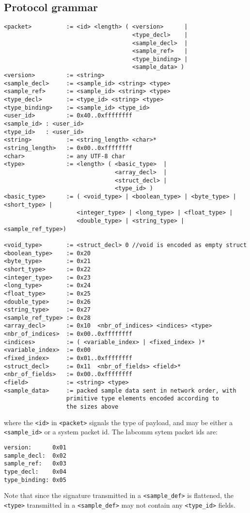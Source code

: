 \documentclass[a4paper]{article}
\begin{document}
\subsection{Protocol grammar}
\label{sec:ConcreteGrammar}
\begin{lstlisting}[basicstyle=\footnotesize\ttfamily]
<packet>          := <id> <length> ( <version>      | 
                                     <type_decl>    | 
                                     <sample_decl>  |
                                     <sample_ref>   |
                                     <type_binding> |
                                     <sample_data> )
<version>         := <string>
<sample_decl>     := <sample_id> <string> <type>
<sample_ref>      := <sample_id> <string> <type>
<type_decl>       := <type_id> <string> <type>
<type_binding>    := <sample_id> <type_id>
<user_id>         := 0x40..0xffffffff  
<sample_id> : <user_id>
<type_id>   : <user_id>
<string>          := <string_length> <char>*
<string_length>   := 0x00..0xffffffff  
<char>            := any UTF-8 char
<type>            := <length> ( <basic_type>  | 
                                <array_decl>  | 
                                <struct_decl> | 
                                <type_id> )
<basic_type>      := ( <void_type> | <boolean_type> | <byte_type> | <short_type> |
                     <integer_type> | <long_type> | <float_type> |
                     <double_type> | <string_type> | <sample_ref_type>)

<void_type>       := <struct_decl> 0 //void is encoded as empty struct
<boolean_type>    := 0x20 
<byte_type>       := 0x21 
<short_type>      := 0x22 
<integer_type>    := 0x23 
<long_type>       := 0x24 
<float_type>      := 0x25 
<double_type>     := 0x26 
<string_type>     := 0x27 
<sample_ref_type> := 0x28 
<array_decl>      := 0x10  <nbr_of_indices> <indices> <type>
<nbr_of_indices>  := 0x00..0xffffffff  
<indices>         := ( <variable_index> | <fixed_index> )*
<variable_index>  := 0x00  
<fixed_index>     := 0x01..0xffffffff  
<struct_decl>     := 0x11  <nbr_of_fields> <field>*
<nbr_of_fields>   := 0x00..0xffffffff  
<field>           := <string> <type>
<sample_data>     := packed sample data sent in network order, with
                  primitive type elements encoded according to
                  the sizes above
\end{lstlisting}
where the \verb+<id>+ in \verb+<packet>+ signals the type of payload,
and may be either a \verb+<sample_id>+ or a system packet id.
The labcomm sytem packet ids are:
\begin{lstlisting}[basicstyle=\footnotesize\ttfamily]
version:      0x01 
sample_decl:  0x02 
sample_ref:   0x03 
type_decl:    0x04 
type_binding: 0x05          
\end{lstlisting}
Note that since the signature transmitted in a \verb+<sample_def>+ is
flattened, the \verb+<type>+ transmitted in a \verb+<sample_def>+ may
not contain any \verb+<type_id>+ fields.
\end{document}
